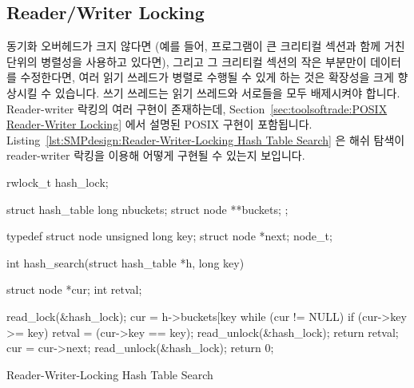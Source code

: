 \fi

\subsection{Reader/Writer Locking}
\label{sec:SMPdesign:Reader/Writer Locking}

동기화 오버헤드가 크지 않다면 (예를 들어, 프로그램이 큰 크리티컬 섹션과 함께
거친 단위의 병렬성을 사용하고 있다면), 그리고 그 크리티컬 섹션의 작은 부분만이
데이터를 수정한다면, 여러 읽기 쓰레드가 병렬로 수행될 수 있게 하는 것은
확장성을 크게 향상시킬 수 있습니다.
쓰기 쓰레드는 읽기 쓰레드와 서로들을 모두 배제시켜야 합니다.
Reader-writer 락킹의 여러 구현이 존재하는데,
Section~\ref{sec:toolsoftrade:POSIX Reader-Writer Locking} 에서 설명된 POSIX
구현이 포함됩니다.
Listing~\ref{lst:SMPdesign:Reader-Writer-Locking Hash Table Search}
은 해쉬 탐색이 reader-writer 락킹을 이용해 어떻게 구현될 수 있는지 보입니다.

\begin{listing}[tbp]
\begin{VerbatimL}[commandchars=\\\[\]]
rwlock_t hash_lock;

struct hash_table
{
	long nbuckets;
	struct node **buckets;
};

typedef struct node {
	unsigned long key;
	struct node *next;
} node_t;

int hash_search(struct hash_table *h, long key)
{
	struct node *cur;
	int retval;

	read_lock(&hash_lock);
	cur = h->buckets[key %
	while (cur != NULL) {
		if (cur->key >= key) {
			retval = (cur->key == key);
			read_unlock(&hash_lock);
			return retval;
		}
		cur = cur->next;
	}
	read_unlock(&hash_lock);
	return 0;
}
\end{VerbatimL}
\caption{Reader-Writer-Locking Hash Table Search}
\label{lst:SMPdesign:Reader-Writer-Locking Hash Table Search}
\end{listing}


